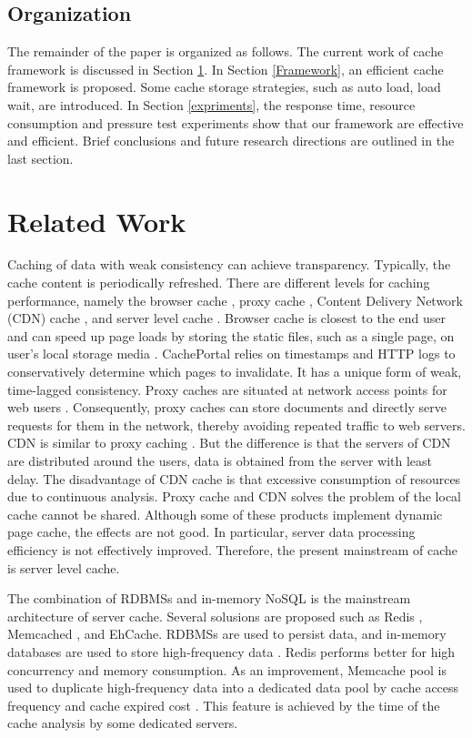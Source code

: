 \documentclass[conference]{IEEEtran}
\begin{document}
\subsection{Organization}
The remainder of the paper is organized as follows. The current work of cache framework is discussed in Section \ref{RelatedWork}. In Section \ref{Framework}, an efficient cache framework is proposed. Some cache storage strategies, such as auto load, load wait, are introduced. In Section \ref{expriments}, the response time, resource consumption and pressure test experiments show that our framework are effective and efficient. Brief conclusions and future research directions are outlined in the last section.

\section{Related Work}
\label{RelatedWork}
Caching of data with weak consistency can achieve transparency. Typically, the cache content is periodically refreshed. There are different levels for caching performance, namely the browser cache \cite{davison2001web}, proxy cache \cite{uruburo2014methodology}, Content Delivery Network (CDN) cache \cite{vakali2003content}, and server level cache \cite{ma2017column}. Browser cache is closest to the end user and can speed up page loads by storing the static files, such as a single page, on user's local storage media \cite{mookerjee2002analysis}. CachePortal \cite{candan2001enabling} relies on timestamps and HTTP logs to conservatively determine which pages to invalidate. It has a unique form of weak, time-lagged consistency. Proxy caches are situated at network access points for web users \cite{uruburo2014methodology}. Consequently, proxy caches can store documents and directly serve requests for them in the network, thereby avoiding repeated traffic to web servers. CDN is similar to proxy caching \cite{vakali2003content}. But the difference is that the servers of CDN are distributed around the users, data is obtained from the server with least delay. The disadvantage of CDN cache is that excessive consumption of resources due to continuous analysis. Proxy cache and CDN solves the problem of the local cache cannot be shared. Although some of these products implement dynamic page cache, the effects are not good. In particular, server data processing efficiency is not effectively improved. Therefore, the present mainstream of cache is server level cache.

The combination of RDBMSs and in-memory NoSQL is the mainstream architecture of server cache. Several solusions are proposed such as Redis \cite{zawodny2009redis}, Memcached \cite{hafeez2017realizing}, and EhCache. RDBMSs are used to persist data, and in-memory databases are used to store high-frequency data \cite {ma2017column}. Redis performs better for high concurrency and memory consumption. As an improvement, Memcache pool is used to duplicate high-frequency data into a dedicated data pool by cache access frequency and cache expired cost \cite{nishtala2013scaling}. This feature is achieved by the time of the cache analysis by some dedicated servers.
\end{document}
